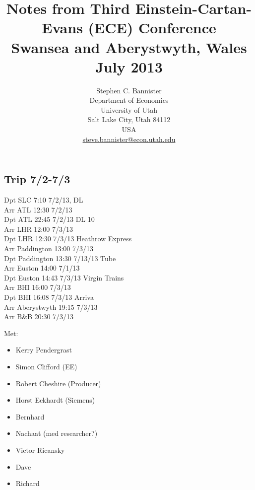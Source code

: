 \documentclass[final]{beamer}
\title{Notes from Third Einstein-Cartan-Evans (ECE) Conference\\Swansea and Aberystwyth, Wales\\July 2013} %
\author{Stephen C. Bannister\\
	Department of Economics\\
	University of Utah\\
	Salt Lake City, Utah 84112\\
	USA\\
	\href{mailto:steve.bannister@econ.utah.edu}{steve.bannister@econ.utah.edu}\\
	}
\date{}
\begin{document}

	\maketitle
	\nocite{*}
%	

	
%	

\begin{frame}
\section{Trip 7/2-7/3}
Dpt SLC 7:10 7/2/13, DL\\
Arr ATL 12:30 7/2/13\\
Dpt ATL 22:45 7/2/13 DL 10\\
Arr LHR 12:00 7/3/13\\
Dpt LHR 12:30 7/3/13 Heathrow Express\\
Arr Paddington 13:00 7/3/13\\
Dpt Paddington 13:30 7/13/13 Tube\\
Arr Euston 14:00 7/1/13\\
Dpt Euston 14:43 7/3/13 Virgin Trains\\
Arr BHI 16:00 7/3/13\\
Dpt BHI 16:08 7/3/13 Arriva\\
Arr Aberystwyth 19:15 7/3/13\\
Arr B\&B 20:30 7/3/13\\
\end{frame}

\begin{frame}
Met:\\
\begin{itemize}
\item Kerry Pendergrast
\item Simon Clifford (EE)
\item Robert Cheshire (Producer)
\item Horst Eckhardt (Siemens)
\item Bernhard
\item Nachaat (med researcher?)
\item Victor Ricansky
\item Dave
\item Richard
\end{itemize}
\end{frame}
\end{document}

